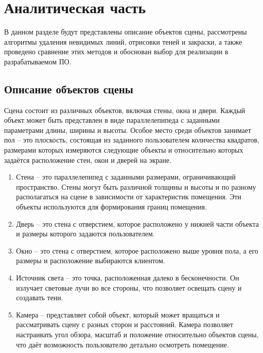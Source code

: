 \section{Аналитическая часть}

\hspace{1.25cm}
В данном разделе будут представлены описание объектов сцены, рассмотрены алгоритмы удаления невидимых линий, отрисовки теней и закраски, а также проведено сравнение этих методов и обоснован выбор для реализации в разрабатываемом ПО.

\subsection{Описание объектов сцены}

\hspace{1.25cm}
Сцена состоит из различных объектов, включая стены, окна и двери. Каждый объект может быть представлен в виде параллелепипеда с заданными параметрами длины, ширины и высоты. Особое место среди объектов занимает пол -- это плоскость, состоящая из заданного пользователем количества квадратов, размерами которых измеряются следующие объекты и относительно которых задаётся расположение стен, окон и дверей на экране.

\begin{enumerate}
\item Стена -- это параллелепипед с заданными размерами, ограничивающий пространство. Стены могут быть различной толщины и высоты и по разному располагаться на сцене в зависимости от характеристик помещения. Эти объекты используются для формирования границ помещения.

\item Дверь -- это стена с отверстием, которое расположено у нижней части объекта и размеры которого задаются пользователем.

\item Окно -- это стена с отверстием, которое расположено выше уровня пола, а его размеры и расположение выбираются клиентом.

\item Источник света -- это точка, расположенная далеко в бесконечности. Он излучает световые лучи во все стороны, что позволяет освещать сцену и создавать тени.

\item Камера -- представляет собой объект, который может вращаться и рассматривать сцену с разных сторон и расстояний. Камера позволяет настраивать угол обзора, масштаб и положение относительно объектов сцены, что даёт возможность пользователю детально осмотреть помещение.
\end{enumerate}

